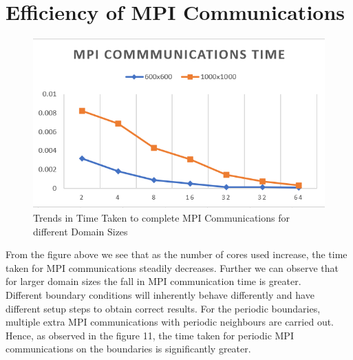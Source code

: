 \documentclass[twoside,twocolumn]{article}
\begin{document}
\begin{table}[H]
\caption{Output Values for a 50x200 vs a 100x100 Domain}
\label{tab:my-table}
\end{table}

\section{Efficiency of MPI Communications}

\vspace{-4mm}
\begin{figure}[H]
\centering
\includegraphics[height=5.5 cm\textwidth]{images/mpicomms.png}
\caption{Trends in Time Taken to complete MPI Communications for different Domain Sizes}
\end{figure}
From the figure above we see that as the number of cores used increase, the time taken for MPI communications steadily decreases. Further we can observe that for larger domain sizes the fall in MPI communication time is greater.\\
Different boundary conditions will inherently behave differently and have different setup steps to obtain correct results. For the periodic boundaries, multiple extra MPI communications with periodic neighbours are carried out. Hence, as observed in the figure 11, the time taken for periodic MPI communications on the boundaries is significantly greater.\\
\end{document}
